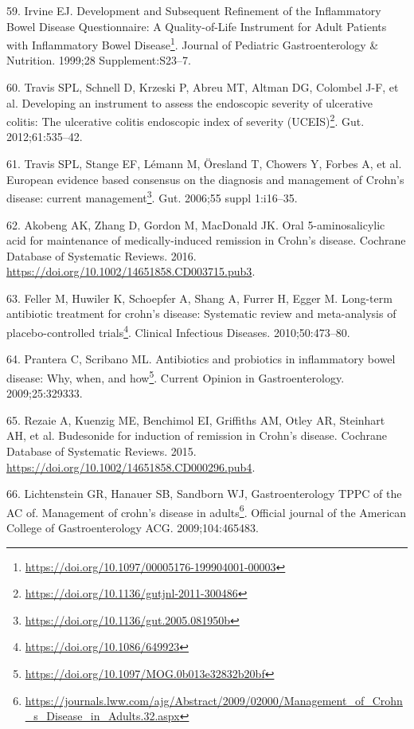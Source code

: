 \documentclass[
  12pt,
  a4paper,
  twoside,
  openright]{book}
\DeclareRobustCommand{\href}[2]{#2\footnote{\url{#1}}}
\newlength{\cslhangindent}
\newlength{\cslentryspacingunit} %
\newenvironment{CSLReferences}[2] %
 {%
  \setlength{\parindent}{0pt}
  \ifodd #1
  \let\oldpar\par
  \def\par{\hangindent=\cslhangindent\oldpar}
  \fi
  \setlength{\parskip}{#2\cslentryspacingunit}
 }%
 {}
\begin{document}
\begin{CSLReferences}{0}{0}
\leavevmode{}%
59. Irvine EJ. \href{https://doi.org/10.1097/00005176-199904001-00003}{Development and Subsequent Refinement of the Inflammatory Bowel Disease Questionnaire: A Quality-of-Life Instrument for Adult Patients with Inflammatory Bowel Disease}. Journal of Pediatric Gastroenterology \& Nutrition. 1999;28 Supplement:S23--7.

\leavevmode{}%
60. Travis SPL, Schnell D, Krzeski P, Abreu MT, Altman DG, Colombel J-F, et al. \href{https://doi.org/10.1136/gutjnl-2011-300486}{Developing an instrument to assess the endoscopic severity of ulcerative colitis: The ulcerative colitis endoscopic index of severity (UCEIS)}. Gut. 2012;61:535--42.

\leavevmode{}%
61. Travis SPL, Stange EF, Lémann M, Öresland T, Chowers Y, Forbes A, et al. \href{https://doi.org/10.1136/gut.2005.081950b}{European evidence based consensus on the diagnosis and management of Crohn{'}s disease: current management}. Gut. 2006;55 suppl 1:i16--35.

\leavevmode{}%
62. Akobeng AK, Zhang D, Gordon M, MacDonald JK. Oral 5{-}aminosalicylic acid for maintenance of medically{-}induced remission in Crohn's disease. Cochrane Database of Systematic Reviews. 2016. \url{https://doi.org/10.1002/14651858.CD003715.pub3}.

\leavevmode{}%
63. Feller M, Huwiler K, Schoepfer A, Shang A, Furrer H, Egger M. \href{https://doi.org/10.1086/649923}{Long-term antibiotic treatment for crohn's disease: Systematic review and meta-analysis of placebo-controlled trials}. Clinical Infectious Diseases. 2010;50:473--80.

\leavevmode{}%
64. Prantera C, Scribano ML. \href{https://doi.org/10.1097/MOG.0b013e32832b20bf}{Antibiotics and probiotics in inflammatory bowel disease: Why, when, and how}. Current Opinion in Gastroenterology. 2009;25:329333.

\leavevmode{}%
65. Rezaie A, Kuenzig ME, Benchimol EI, Griffiths AM, Otley AR, Steinhart AH, et al. Budesonide for induction of remission in Crohn's disease. Cochrane Database of Systematic Reviews. 2015. \url{https://doi.org/10.1002/14651858.CD000296.pub4}.

\leavevmode{}%
66. Lichtenstein GR, Hanauer SB, Sandborn WJ, Gastroenterology TPPC of the AC of. \href{https://journals.lww.com/ajg/Abstract/2009/02000/Management_of_Crohn_s_Disease_in_Adults.32.aspx}{Management of crohn's disease in adults}. Official journal of the American College of Gastroenterology \textbar{} ACG. 2009;104:465483.


\end{CSLReferences}
\end{document}
